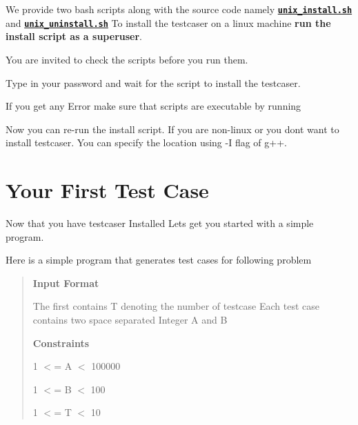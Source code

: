 We provide two bash scripts along with the source code namely 
\href{https://github.com/coder3101/testcaser/blob/master/unix_install.sh}{\texttt{ {\bfseries{unix\+\_\+install.\+sh}}}} and 
\href{https://github.com/coder3101/testcaser/blob/master/unix_uninstall.sh}{\texttt{ {\bfseries{unix\+\_\+uninstall.\+sh}}}} To install the testcaser on a linux machine {\bfseries{run the install script as a superuser}}.

You are invited to check the scripts before you run them.


\begin{DoxyCode}{0}
\end{DoxyCode}


Type in your password and wait for the script to install the testcaser.

If you get any Error make sure that scripts are executable by running 
\begin{DoxyCode}{0}
\end{DoxyCode}


Now you can re-\/run the install script. If you are non-\/linux or you don\textquotesingle{}t want to install testcaser. You can specify the location using {\ttfamily -\/I} flag of {\ttfamily g++}. 

\hypertarget{index_started}{}\section{Your First Test Case}\label{index_started}
Now that you have testcaser Installed Let\textquotesingle{}s get you started with a simple program.

Here is a simple program that generates test cases for following problem \begin{quote}
{\bfseries{Input Format}}

The first contains T denoting the number of testcase Each test case contains two space separated Integer A and B

{\bfseries{Constraints}}

1 $<$= A $<$ 100000

1 $<$= B $<$ 100

1 $<$= T $<$ 10 \end{quote}



